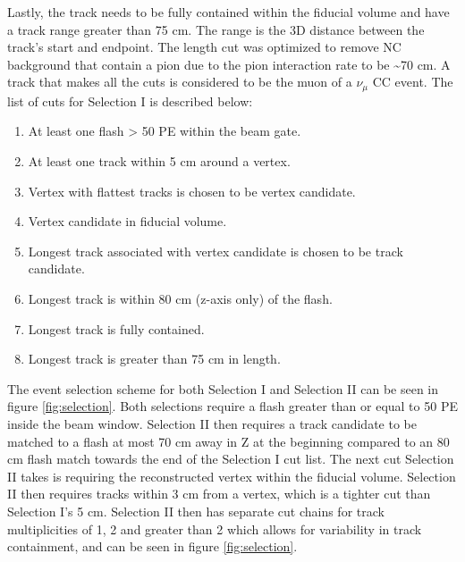 Lastly, the track needs to be fully contained within the fiducial volume and have a track range greater than 75 cm. The range is the 3D distance between the track's start and endpoint. The length cut was optimized to remove NC background that contain a pion due to the pion interaction rate to be \sim 70 cm. A track that makes all the cuts is considered to be the muon of a $\nu_{\mu}$ CC event. The list of cuts for Selection I is described below:
\begin{enumerate}
\item At least one flash > 50 PE within the beam gate.
\item At least one track within 5 cm around a vertex.
\item Vertex with flattest tracks is chosen to be vertex candidate.
\item Vertex candidate in fiducial volume.
\item Longest track associated with vertex candidate is chosen to be track candidate.
\item Longest track is within 80 cm (z-axis only) of the flash.
\item Longest track is fully contained.
\item Longest track is greater than 75 cm in length.
\end{enumerate}

The event selection scheme for both Selection I and Selection II can be seen in figure \ref{fig:selection}. Both selections require a flash greater than or equal to 50 PE inside the beam window. Selection II then requires a track candidate to be matched to a flash at most 70 cm away in Z at the beginning compared to an 80 cm flash match towards the end of the Selection I cut list. The next cut Selection II takes is requiring the reconstructed vertex within the fiducial volume. Selection II then requires tracks within 3 cm from a vertex, which is a tighter cut than Selection I's 5 cm. Selection II then has separate cut chains for track multiplicities of 1, 2 and greater than 2 which allows for variability in track containment, and can be seen in figure \ref{fig:selection}.   


